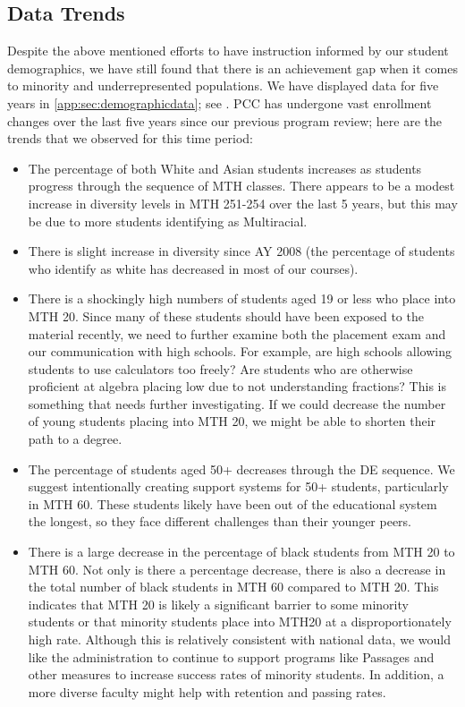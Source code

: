 \subsection{Data Trends}\label{needs:sec:trends}
Despite the above mentioned efforts to have instruction informed by our student demographics, we have still found that there is an achievement gap when it comes to minority and underrepresented populations. We have displayed data for five years in \vref{app:sec:demographicdata}; see . PCC has undergone vast enrollment changes over the last five years since our previous program review; here are the trends that we observed for this time period:
\begin{itemize}
	\item The percentage of both White and Asian students increases as students progress through the sequence of MTH classes. There appears to be a modest increase in diversity levels in MTH 251-254 over the last 5 years, but this may be due to more students identifying as Multiracial.
	\item There is slight increase in diversity since AY 2008 (the percentage of students who identify as white has decreased in most of our courses).  
	\item There is a shockingly high numbers of students aged 19 or less who place into MTH 20. Since many of these students should have been exposed to the material recently, we need to further examine both the placement exam and our communication with high schools. For example, are high schools allowing students to use calculators too freely? Are students who are otherwise proficient at algebra placing low due to not understanding fractions? This is something that needs further investigating. If we could decrease the number of young students placing into MTH 20, we might be able to shorten their path to a degree.
	\item The percentage of students aged 50+ decreases through the DE sequence. We suggest intentionally creating support systems for 50+ students, particularly in MTH 60. These students likely have been out of the educational system the longest, so they face different challenges than their younger peers.
	\item There is a large decrease in the percentage of black students from MTH 20 to MTH 60. Not only is there a percentage decrease, there is also a decrease in the total number of black students in MTH 60 compared to MTH 20. This indicates that MTH 20 is likely a significant barrier to some minority students or that minority students place into MTH20 at a disproportionately high rate. Although this is relatively consistent with national data, we would like the administration to continue to support programs like Passages and other measures to increase success rates of minority students. In addition, a more diverse faculty might help with retention and passing rates.

\end{itemize}

